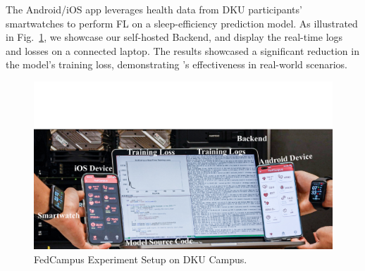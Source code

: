 \documentclass[conference]{IEEEtran}
\begin{document}
\subsubsection{\FedCampus{}}
The \FedCampus{} Android/iOS app leverages health data from
DKU participants' smartwatches to perform FL on
a sleep-efficiency prediction model.
As illustrated in Fig.~\ref{fig:fedcampus},
we showcase our self-hosted Backend,
and display the real-time logs and losses on a connected laptop.
The results showcased a significant reduction in the model's training loss,
demonstrating \FedKit{}'s effectiveness in real-world scenarios.

\begin{figure}
    \centering
    \includegraphics*[width=0.9\linewidth]{fedcampus.pdf}
    \caption{FedCampus Experiment Setup on DKU Campus.}
    \label{fig:fedcampus}
\end{figure}



\end{document}

